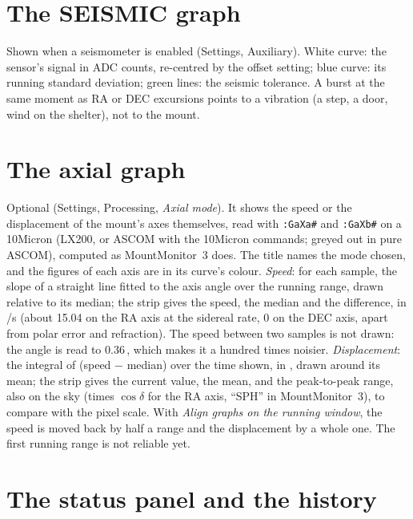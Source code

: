 \section{The SEISMIC graph}
\label{sec:seismic}

Shown when a seismometer is enabled (Settings, Auxiliary). White curve: the
sensor's signal in ADC counts, re-centred by the offset setting; blue curve:
its running standard deviation; green lines: the seismic tolerance. A burst at
the same moment as RA or DEC excursions points to a vibration (a step, a door,
wind on the shelter), not to the mount.

\section{The axial graph}

Optional (Settings, Processing, \emph{Axial mode}). It shows the speed or
the displacement of the mount's axes themselves, read with \texttt{:GaXa\#}
and \texttt{:GaXb\#} on a 10Micron (LX200, or ASCOM with the 10Micron
commands; greyed out in pure ASCOM), computed as MountMonitor~3 does. The
title names the mode chosen, and the figures of each axis are in its curve's colour. \emph{Speed}: for each sample,
the slope of a straight line fitted to the axis angle over the running range,
drawn relative to its median; the strip gives the speed, the median and the
difference, in \arcsec/s (about 15.04 on the RA axis at the sidereal rate, 0
on the DEC axis, apart from polar error and refraction). The speed between
two samples is not drawn: the angle is read to 0.36\,\arcsec, which makes it
a hundred times noisier. \emph{Displacement}: the integral of (speed $-$
median) over the time shown, in \arcsec, drawn around its mean; the strip
gives the current value, the mean, and the peak-to-peak range, also on the
sky (times $\cos\delta$ for the RA axis, ``SPH'' in MountMonitor~3), to
compare with the pixel scale. With \emph{Align graphs on the running window},
the speed is moved back by half a range and the displacement by a whole one.
The first running range is not reliable yet.

\section{The status panel and the history}
\label{sec:panel}

